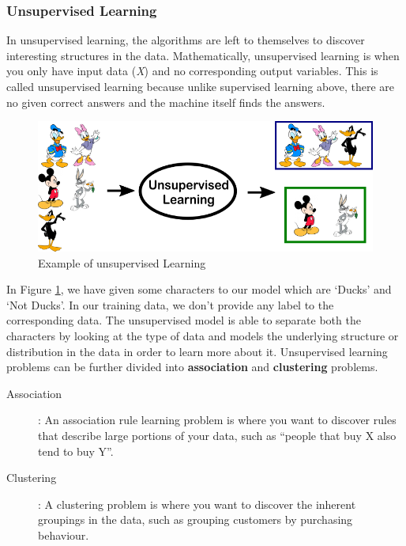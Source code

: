 \documentclass{report}
\begin{document}
\subsubsection{Unsupervised Learning}

In unsupervised learning, the algorithms are left to themselves to discover interesting structures in the data. Mathematically, unsupervised
learning is when you only have input data (\textit{X}) and no corresponding output variables. This is called unsupervised learning because
unlike supervised learning above, there are no given correct answers and the machine itself finds the answers.
\begin{figure}[h]
  \centering
  \includegraphics[scale=0.3]{unsupervised_learning_example}
  \caption{Example of unsupervised Learning}
  \label{fig:unsupervised_learning_example}
\end{figure}
In Figure \ref{fig:unsupervised_learning_example}, we have given some characters to our model which are ‘Ducks’ and ‘Not Ducks’. In our
training data, we don’t provide any label to the corresponding data. The unsupervised model is able to separate both the characters by
looking at the type of data and models the underlying structure or distribution in the data in order to learn more about it. Unsupervised
learning problems can be further divided into \textbf{association} and \textbf{clustering} problems.

\begin{description}
\item[ Association] : An association rule learning problem is where you want to discover rules that describe large portions of your data, such as “people that buy X also tend to buy Y”.
\item[ Clustering] : A clustering problem is where you want to discover the inherent groupings in the data, such as grouping customers by purchasing behaviour.
\end{description}
\end{document}

